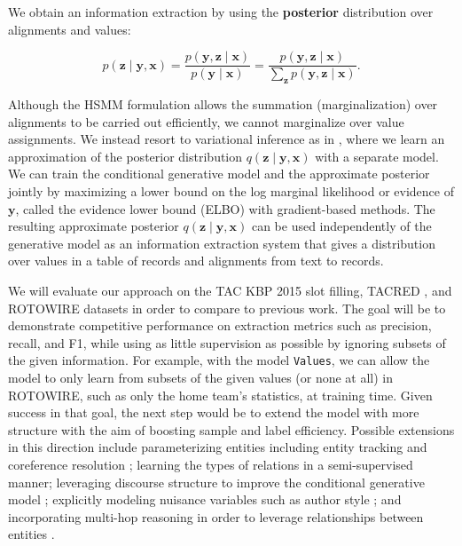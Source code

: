 \documentclass[12pt]{article}
\newcommand{\bx}{\mathbf{x}}
\newcommand{\by}{\mathbf{y}}
\newcommand{\bz}{\mathbf{z}}
\begin{document}
We obtain an information extraction by using the 
\textbf{posterior} distribution over alignments and values:
\begin{linenomath*}
$$
p(\bz\mid\by,\bx)=\frac{p(\by,\bz\mid\bx)}{p(\by\mid\bx)}=\frac{p(\by,\bz\mid\bx)}{\sum_\bz p(\by,\bz\mid\bx)}.
$$
\end{linenomath*}
Although the HSMM formulation allows the summation (marginalization) over alignments to be carried out efficiently,
we cannot marginalize over value assignments.
We instead resort to variational inference as in \citet{deng2018attn},
where we learn an approximation of the posterior distribution $q(\bz\mid\by,\bx)$
with a separate model.
We can train the conditional generative model and the approximate posterior jointly 
by maximizing a lower bound on the log marginal likelihood or evidence of $\by$,
called the evidence lower bound (ELBO) with gradient-based methods.
The resulting approximate posterior $q(\bz\mid\by,\bx)$ can be used independently of the 
generative model as an information extraction system that gives a distribution over
values in a table of records and alignments from text to records.

We will evaluate our approach on the 
TAC KBP 2015 slot filling, TACRED \citep{zhang2017slotfilling},
and ROTOWIRE \citep{wiseman2017d2t} datasets in order to compare to previous work.
The goal will be to demonstrate competitive performance on
extraction metrics such as precision, recall, and F1, while using as little supervision
as possible by ignoring subsets of the given information.
For example, with the model \texttt{Values}, we can allow the model to only learn from
subsets of the given values (or none at all) in ROTOWIRE, such as only
the home team's statistics, at training time.
Given success in that goal, the next step would be to extend the model
with more structure with the aim of boosting sample and label efficiency.
Possible extensions in this direction include parameterizing entities including
entity tracking and coreference resolution \citep{haghighi2010coref};
learning the types of relations in a semi-supervised manner;
leveraging discourse structure to improve the conditional generative model
\citep{sauper2009wiki}; explicitly modeling nuisance variables such as
author style \citep{hsu2017speech}; and incorporating multi-hop
reasoning in order to leverage relationships between entities
\citep{chen2018diva,rock17prove}.
\end{document}
